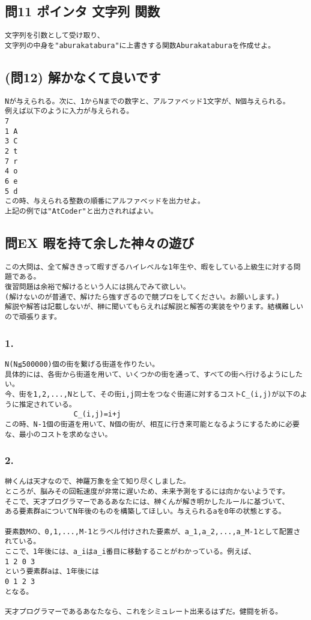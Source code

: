 \subsection{問11 ポインタ 文字列 関数}
\begin{verbatim}
文字列を引数として受け取り、
文字列の中身を"aburakatabura"に上書きする関数Aburakataburaを作成せよ。
\end{verbatim}
\subsection{(問12) 解かなくて良いです}
\begin{verbatim}
Nが与えられる。次に、1からNまでの数字と、アルファベッド1文字が、N個与えられる。
例えば以下のように入力が与えられる。
7
1 A
3 C
2 t
7 r
4 o
6 e
5 d
この時、与えられる整数の順番にアルファベッドを出力せよ。
上記の例では"AtCoder"と出力されればよい。
\end{verbatim}




\subsection{問EX 暇を持て余した神々の遊び}

\begin{verbatim}
この大問は、全て解ききって暇すぎるハイレベルな1年生や、暇をしている上級生に対する問題である。
復習問題は余裕で解けるという人には挑んでみて欲しい。
(解けないのが普通で、解けたら強すぎるので競プロをしてください。お願いします。)
解説や解答は記載しないが、榊に聞いてもらえれば解説と解答の実装をやります。結構難しいので頑張ります。
\end{verbatim}

\subsubsection{1.}
\begin{verbatim}
N(N≦500000)個の街を繋げる街道を作りたい。
具体的には、各街から街道を用いて、いくつかの街を通って、すべての街へ行けるようにしたい。
今、街を1,2,...,Nとして、その街i,j同士をつなぐ街道に対するコストC_(i,j)が以下のように推定されている。
                C_(i,j)=i+j
この時、N-1個の街道を用いて、N個の街が、相互に行き来可能となるようにするために必要な、最小のコストを求めなさい。
\end{verbatim}
\subsubsection{2.}
\begin{verbatim}
榊くんは天才なので、神羅万象を全て知り尽くしました。
ところが、脳みその回転速度が非常に遅いため、未来予測をするには向かないようです。
そこで、天才プログラマーであるあなたには、榊くんが解き明かしたルールに基づいて、
ある要素群aについてN年後のものを構築してほしい。与えられるaを0年の状態とする。

要素数Mの、0,1,...,M-1とラベル付けされた要素が、a_1,a_2,...,a_M-1として配置されている。
ここで、1年後には、a_iはa_i番目に移動することがわかっている。例えば、
1 2 0 3
という要素群aは、1年後には
0 1 2 3
となる。

天才プログラマーであるあなたなら、これをシミュレート出来るはずだ。健闘を祈る。
\end{verbatim}
